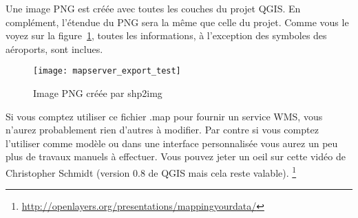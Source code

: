 Une image PNG est cr\'e\'ee avec toutes les couches du projet QGIS. En compl\'ement, l'\'etendue du PNG sera la m\^eme que celle du projet. Comme vous le voyez sur la figure~\ref{fig:mapserver_export_test}, toutes les informations, \`a l'exception des symboles des a\'eroports, sont inclues.

%

\begin{figure}[ht]
\begin{center}
  \caption{Image PNG cr\'e\'ee par shp2img \nixcaption}
  \label{fig:mapserver_export_test}\smallskip
  \texttt{[image: mapserver\_export\_test]}
\end{center}
\end{figure}

Si vous comptez utiliser ce fichier .map pour fournir un service WMS, vous n'aurez probablement rien d'autres \`a modifier. Par contre si vous comptez l'utiliser comme mod\`ele ou dans une interface personnalis\'ee vous aurez un peu plus de travaux manuels \`a effectuer. Vous pouvez jeter un oeil sur cette vid\'eo de Christopher Schmidt (version 0.8 de QGIS mais cela reste valable).
\footnote{\url{http://openlayers.org/presentations/mappingyourdata/}}
